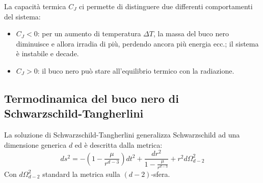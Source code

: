 La capacità termica $C_J$ ci permette di distinguere due differenti comportamenti del sistema:
\begin{itemize}
    \item $C_J < 0$: per un aumento di temperatura $\Delta T$, la massa del buco nero diminuisce e allora irradia di più, perdendo ancora più energia ecc.; il sistema è instabile e decade.
    \item $C_J > 0$: il buco nero può stare all'equilibrio termico con la radiazione.
\end{itemize}
\subsection{Termodinamica del buco nero di Schwarzschild-Tangherlini}
La soluzione di Schwarzschild-Tangherlini generalizza Schwarzschild ad una dimensione generica $d$ ed è descritta dalla metrica:
\begin{equation}
    ds^2 = - \left( 1 - \frac{\mu}{r^{d-3}}\right) dt^2 + \frac{dr^2}{1 - \frac{\mu}{r^{d-3}}} + r^2d\Omega_{d-2}^2
    \label{eq.schwarz_tangherlini}
\end{equation}
Con $d\Omega_{d-2}^2$ standard la metrica sulla $(d-2)$-sfera.

